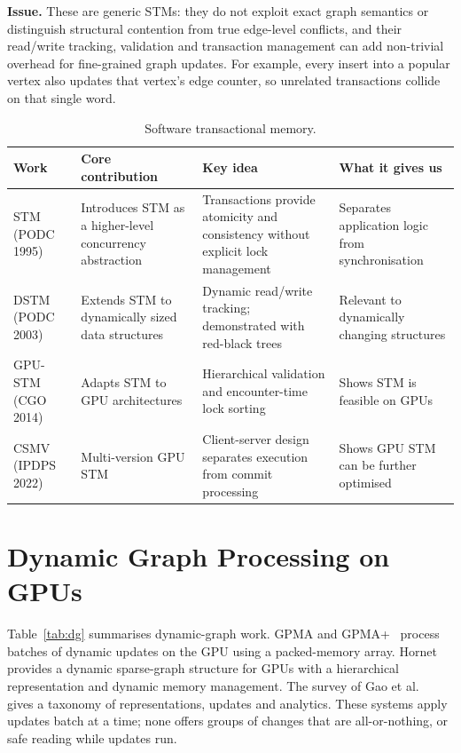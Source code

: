 \documentclass[11pt,a4paper,oneside]{report}
\begin{document}
\textbf{Issue.} These are generic STMs: they do not exploit exact graph semantics or distinguish structural contention
from true edge-level conflicts, and their read/write tracking, validation and transaction management can add
non-trivial overhead for fine-grained graph updates. For example, every insert into a popular vertex also updates that
vertex's edge counter, so unrelated transactions collide on that single word.

\begin{table}[H]
\caption{Software transactional memory.}
\label{tab:stm}
\small
\begin{singlespace}
\begin{tabular}{@{}P{2.6cm}P{3.9cm}P{4.6cm}P{3.6cm}@{}}
\toprule
Work & Core contribution & Key idea & What it gives us \\
\midrule
STM (PODC 1995)~\cite{stm} & Introduces STM as a higher-level concurrency abstraction & Transactions provide atomicity and consistency without explicit lock management & Separates application logic from synchronisation \\
DSTM (PODC 2003)~\cite{dstm} & Extends STM to dynamically sized data structures & Dynamic read/write tracking; demonstrated with red-black trees & Relevant to dynamically changing structures \\
GPU-STM (CGO 2014)~\cite{gpustm} & Adapts STM to GPU architectures & Hierarchical validation and encounter-time lock sorting & Shows STM is feasible on GPUs \\
CSMV (IPDPS 2022)~\cite{csmv} & Multi-version GPU STM & Client-server design separates execution from commit processing & Shows GPU STM can be further optimised \\
\bottomrule
\end{tabular}
\end{singlespace}
\end{table}

\section{Dynamic Graph Processing on GPUs}
Table~\ref{tab:dg} summarises dynamic-graph work. GPMA and GPMA+~\cite{gpma} process batches of dynamic updates on the
GPU using a packed-memory array. Hornet~\cite{hornet} provides a dynamic sparse-graph structure for GPUs with a
hierarchical representation and dynamic memory management. The survey of Gao et al.~\cite{survey} gives a taxonomy of
representations, updates and analytics. These systems apply updates batch at a time; none offers groups of changes that
are all-or-nothing, or safe reading while updates run.
\end{document}
